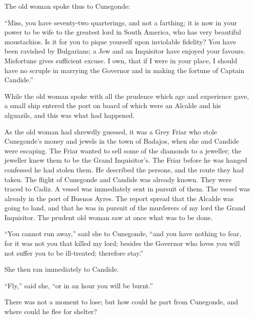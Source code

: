 The old woman spoke thus to Cunegonde:

``Miss, you have seventy-two quarterings, and not a farthing; it is now in your power to be wife to the greatest lord in South America, who has very beautiful moustachios. Is it for you to pique yourself upon inviolable fidelity? You have been ravished by Bulgarians; a Jew and an Inquisitor have enjoyed your favours. Misfortune gives sufficient excuse. I own, that if I were in your place, I should have no scruple in marrying the Governor and in making the fortune of Captain Candide.''

While the old woman spoke with all the prudence which age and experience gave, a small ship entered the port on board of which were an Alcalde and his alguazils, and this was what had happened.

As the old woman had shrewdly guessed, it was a Grey Friar who stole Cunegonde's money and jewels in the town of Badajos, when she and Candide were escaping. The Friar wanted to sell some of the diamonds to a jeweller; the jeweller knew them to be the Grand Inquisitor's. The Friar before he was hanged confessed he had stolen them. He described the persons, and the route they had taken. The flight of Cunegonde and Candide was already known. They were traced to Cadiz. A vessel was immediately sent in pursuit of them. The vessel was already in the port of Buenos Ayres. The report spread that the Alcalde was going to land, and that he was in pursuit of the murderers of my lord the Grand Inquisitor. The prudent old woman saw at once what was to be done.

``You cannot run away,'' said she to Cunegonde, ``and you have nothing to fear, for it was not you that killed my lord; besides the Governor who loves you will not suffer you to be ill-treated; therefore stay.''

She then ran immediately to Candide.

``Fly,'' said she, ``or in an hour you will be burnt.''

There was not a moment to lose; but how could he part from Cunegonde, and where could he flee for shelter?

